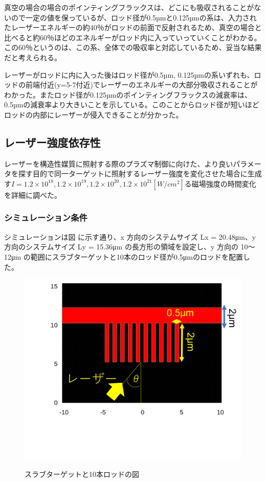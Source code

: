 \documentclass[a4paper,11pt,titlepage]{jarticle}
\numberwithin{equation}{section} %
\begin{document}
    真空の場合の場合のポインティングフラックスは、どこにも吸収されることがないので一定の値を保っているが、ロッド径が0.5µmと0.125µmの系は、入力されたレーザーエネルギーの約40％がロッドの前面で反射されるため、真空の場合と比べると約60％ほどのエネルギーがロッド内に入っていっていくことがわかる。この60％というのは、この系、全体での吸収率と対応しているため、妥当な結果だと考えられる。
    
    レーザーがロッドに内に入った後はロッド径が0.5µm, 0.125µmの系いずれも、ロッドの前端付近(y=5-7付近)でレーザーのエネルギーの大部分吸収されることがわかった。またロッド径が0.125µmのポインティングフラックスの減衰率は、0.5µmの減衰率より大きいことを示している。このことからロッド径が短いほどロッドの内部にレーザーが侵入できることが分かった。    

\subsection{レーザー強度依存性}
レーザーを構造性媒質に照射する際のプラズマ制御に向けた、より良いパラメータを探す目的で同一ターゲットに照射するレーザー強度を変化させた場合に生成す$I=1.2\times 10^{18}, 1.2\times 10^{19}, 1.2\times 10^{20}, 1.2\times 10^{21}[W/cm^2]$る磁場強度の時間変化を詳細に調べた。

\subsubsection{シミュレーション条件}
シミュレーションは図 に示す通り、x 方向のシステムサイズ Lx = 20.48μm、y 方向のシステムサイズ Ly = 15.36μm の長方形の領域を設定し、y 方向の 10～12μm の範囲にスラブターゲットと10本のロッド径が0.5μmのロッドを配置した。

\begin{figure}[H]
  \begin{center}
    \includegraphics[scale=0.6]{./image/4-9-10rod.png}
    \label{fig:4-12}
    \caption{スラブターゲットと10本ロッドの図}
  \end{center}
\end{figure}
\end{document}
